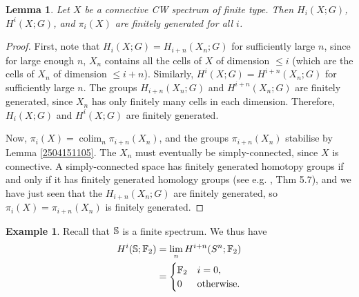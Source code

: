 \documentclass[11pt, titlepage]{article} %
\def\bb{\ensuremath\mathbb}
\def\subq{\ensuremath\subseteq}
\DeclareMathOperator{\colim}{colim}
\numberwithin{equation}{subsection}
\theoremstyle{plain}
\newtheorem{lemma}[theorem]{Lemma}
\theoremstyle{definition}
\newtheorem{example}[theorem]{Example}
\begin{document}
\begin{lemma}\label{2504141556}
Let \(X\) be a connective CW spectrum of finite type. Then \(H_i(X;G)\), \(H^i(X;G)\), and \(\pi_i(X)\) are finitely generated for all \(i\). 
\end{lemma}

\begin{proof}
First, note that \(H_i(X;G)=H_{i+n}(X_n;G)\) for sufficiently large \(n\), since for large enough \(n\), \(X_n\) contains all the cells of \(X\) of  dimension \(\leq i\) (which are the cells of \(X_n\) of dimension \(\leq i+n\)). Similarly, \(H^i(X;G)=H^{i+n}(X_n;G)\) for sufficiently large \(n\). The groups \(H_{i+n}(X_n;G)\) and \(H^{i+n}(X_n;G)\) are finitely generated, since \(X_n\) has only finitely many cells in each dimension. Therefore, \(H_i(X;G)\) and \(H^i(X;G)\) are finitely generated. 

Now, \(\pi_i(X)=\colim_n \pi_{i+n}(X_n)\), and the groups \(\pi_{i+n}(X_n)\) stabilise by Lemma \ref{2504151105}. The \(X_n\) must eventually be simply-connected, since \(X\) is connective. %
A simply-connected space has finitely generated homotopy groups if and only if it has finitely generated homology groups (see e.g. \autocite{hatcher}, Thm 5.7), and we have just seen that the \(H_{i+n}(X_n;G)\) are finitely generated, so \(\pi_i(X)=\pi_{i+n}(X_n)\) is finitely generated. 
\end{proof}

\begin{example}
Recall that \(\bb{S}\) is a finite spectrum. We thus have
\begin{align*}
H^i(\bb{S}; \bb{F}_2)&=\lim_nH^{i+n}(S^n; \bb{F}_2)\\
&=\begin{cases}
\bb{F}_2 & i = 0,\\
0 & \text{otherwise.}
\end{cases}
\end{align*}
\end{example}
\end{document}
